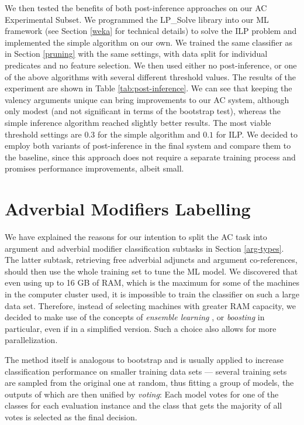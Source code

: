 \documentclass[12pt,notitlepage,a4paper]{report}
\begin{document}
We then tested the benefits of both post-inference approaches on our AC Experimental Subset. We programmed the LP\_Solve library into our ML framework (see Section \ref{weka} for technical details) to solve the ILP problem and implemented the simple algorithm on our own. We trained the same classifier as in Section \ref{pruning} with the same settings, with data split for individual predicates and no feature selection. We then used either no post-inference, or one of the above algorithms with several different threshold values. The results of the experiment are shown in Table \ref{tab:post-inference}. We can see that keeping the valency arguments unique can bring improvements to our AC system, although only modest (and not significant in terms of the bootstrap test), whereas the simple inference algorithm reached slightly better results. The most viable threshold settings are $0.3$ for the simple algorithm and $0.1$ for ILP. We decided to employ both variants of post-inference in the final system and compare them to the baseline, since this approach does not require a separate training process and promises performance improvements, albeit small.

\section{Adverbial Modifiers Labelling}\label{ac-am}

We have explained the reasons for our intention to split the AC task into argument and adverbial modifier classification subtasks in Section \ref{arg-types}. The latter subtask, retrieving free adverbial adjuncts and argument co-references, should then use the whole training set to tune the ML model. We discovered that even using up to 16 GB of RAM, which is the maximum for some of the machines in the computer cluster used, it is impossible to train the classifier on such a large data set. Therefore, instead of selecting machines with greater RAM capacity, we decided to make use of the concepts of \emph{ensemble learning} \citep[p.~605ff.]{opitz99,hastie09}, or \emph{boosting} \citep[p.~321ff.]{witten05} in particular, even if in a simplified version. Such a choice also allows for more parallelization.

The method itself is analogous to bootstrap and is usually applied to increase classification performance on smaller training data sets --- several training sets are sampled from the original one at random, thus fitting a group of models, the outputs of which are then unified by \emph{voting}: Each model votes for one of the classes for each evaluation instance and the class that gets the majority of all votes is selected as the final decision.
\end{document}
